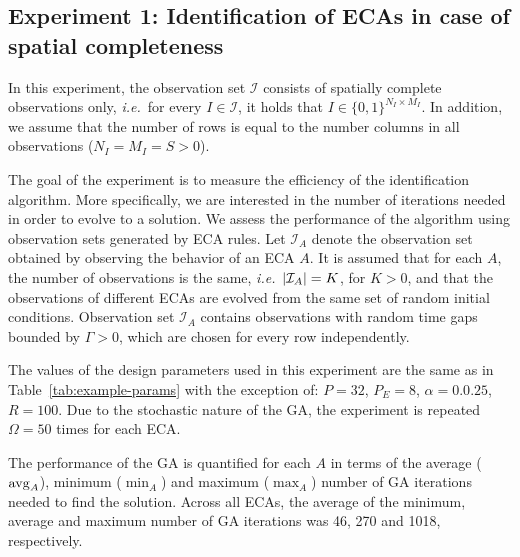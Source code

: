 \subsection{Experiment 1: Identification of ECAs in case of spatial completeness}
In this experiment, the observation set $\mathcal{I}$ consists of spatially complete observations only, \emph{i.e.}\ for every $I\in\mathcal{I}$, it holds that $I\in\{0,1\}^{N_I\times M_I}$. In addition, we assume that the number of rows is equal to the number columns in all observations ($N_I = M_I = S > 0$).

The goal of the experiment is to measure the efficiency of the identification algorithm. More specifically, we are interested in the number of iterations needed in order to evolve to a solution. We assess the performance of the algorithm using observation sets generated by ECA rules. Let $\mathcal{I}_{A}$ denote the observation set obtained by observing the behavior of an ECA $A$. It is assumed that for each $A$, the number of observations is the same, \emph{i.e.}\ $\lvert\mathcal{I}_A\rvert = K$, for $K>0$, and that the observations of different ECAs are evolved from the same set of random initial conditions. Observation set $\mathcal{I}_A$ contains observations with random time gaps bounded by $\Gamma>0$, which are chosen for every row independently.

The values of the design parameters used in this experiment are the same as in Table~\ref{tab:example-params} with the exception of: $P=32$, $P_E=8$, $\alpha=0.0.25$, $R=100$. Due to the stochastic nature of the GA, the experiment is repeated $\Omega=50$ times for each ECA.

The performance of the GA is quantified for each $A$ in terms of the average ($\operatorname{avg}_A$), minimum ($\min_A$) and maximum ($\max_A$) number of GA iterations needed to find the solution. Across all ECAs, the average of the minimum, average and maximum number of GA iterations was 46, 270 and 1018, respectively.

